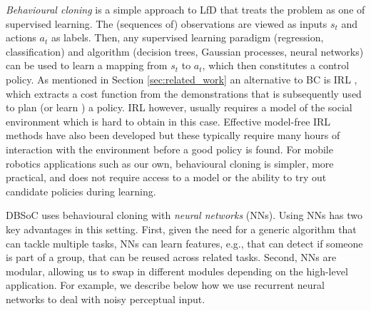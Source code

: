\documentclass[letterpaper, 10 pt, conference]{ieeeconf}
\newcommand{\sw}[1]{\textcolor{red}{SW: #1}}
\newcommand{\ks}[1]{\textcolor{mypurp}{KS: #1}}
\begin{document}
\emph{Behavioural cloning} is a simple approach to LfD that treats the problem as one of supervised learning. The (sequences of) observations are viewed as inputs $s_t$ and actions $a_t$ as labels.  Then, any supervised learning paradigm (regression, classification) and algorithm (decision trees, Gaussian processes, neural networks) \cite{bishop2006pattern} can be used to learn a mapping from $s_t$ to $a_t$, which then constitutes a control policy. As mentioned in Section \ref{sec:related_work} an alternative to BC is IRL \cite{abbeel2004apprenticeship}, which extracts a cost function from the demonstrations that is subsequently used to plan (or learn \cite{boularias2011relative}) a policy. IRL however, usually requires a model of the social environment which is hard to obtain in this case. Effective model-free IRL methods have also been developed \cite{ho2016generative} but these typically require many hours of interaction with the environment before a good policy is found. For mobile robotics applications such as our own, behavioural cloning is simpler, more practical, and does not require access to a model or the ability to try out candidate policies during learning. %

DBSoC uses behavioural cloning with \emph{neural networks} (NNs).  Using NNs has two key advantages in this setting.  First, given the need for a generic algorithm that can tackle multiple tasks, NNs can learn features, e.g., that can detect if someone is part of a group, that can be reused across related tasks.  Second, NNs are modular, allowing us to swap in different modules depending on the high-level application. For example, we describe below how we use
recurrent neural networks to deal with noisy perceptual input.


\end{document}
